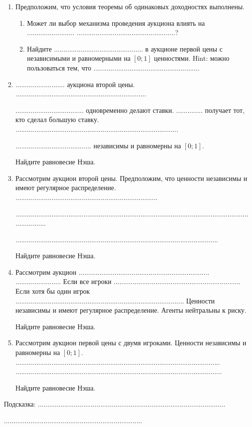 \documentclass[pdftex,12pt,a4paper]{article}
\begin{document}
\begin{enumerate}
\item Предположим, что условия теоремы об одинаковых доходностях выполнены. 
\begin{enumerate}
\item Может ли выбор механизма проведения аукциона влиять на .........................
....................................................?
\item  Найдите ............................................... в аукционе первой цены с независимыми и равномерными на $ [0;1] $ ценностями. Hint: можно пользоваться тем, что ........................................................
\end{enumerate}


\item .......................... аукциона второй цены. .....................................................................

.................................... одновременно делают ставки. .............. получает тот, кто сделал большую ставку. ......................................................................................

........................................ независимы и равномерны на $ [0;1] $. 

Найдите равновесие Нэша.

\item Рассмотрим аукцион второй цены. Предположим, что ценности независимы и имеют регулярное распределение. ...........................................................................

...........................................................................................................................................

...........................................................................................................

Найдите равновесие Нэша.



\item Рассмотрим аукцион .....................................................................
........................ Если все игроки ................................................................... Если хотя бы один игрок ......................................................................................... Ценности независимы и имеют регулярное распределение. Агенты нейтральны к риску. 

Найдите равновесие Нэша.

\item Рассмотрим аукцион первой цены с двумя игроками. Ценности независимы и равномерны на $ [0;1] $. ............................................................................................................
.............................................................................................................


Найдите равновесие Нэша.

\end{enumerate}

Подсказка: ...................................................................................................

.........................................................................



\printindex %
\end{document}
